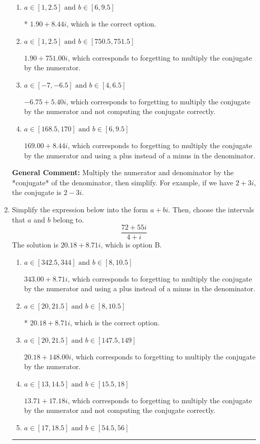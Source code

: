 \documentclass{extbook}[14pt]
\newcommand{\litem}[1]{\item #1

\rule{\textwidth}{0.4pt}}
\begin{document}
\begin{enumerate}
{\begin{enumerate}[label=\Alph*.]
 $-3.38  + 15.40 i$, which corresponds to just dividing the first term by the first term and the second by the second.
\item \( a \in [1, 2.5] \text{ and } b \in [6, 9.5] \)

* $1.90  + 8.44 i$, which is the correct option.
\item \( a \in [1, 2.5] \text{ and } b \in [750.5, 751.5] \)

 $1.90  + 751.00 i$, which corresponds to forgetting to multiply the conjugate by the numerator.
\item \( a \in [-7, -6.5] \text{ and } b \in [4, 6.5] \)

 $-6.75  + 5.40 i$, which corresponds to forgetting to multiply the conjugate by the numerator and not computing the conjugate correctly.
\item \( a \in [168.5, 170] \text{ and } b \in [6, 9.5] \)

 $169.00  + 8.44 i$, which corresponds to forgetting to multiply the conjugate by the numerator and using a plus instead of a minus in the denominator.
\end{enumerate}

\textbf{General Comment:} Multiply the numerator and denominator by the *conjugate* of the denominator, then simplify. For example, if we have $2+3i$, the conjugate is $2-3i$.
}
\litem{
Simplify the expression below into the form $a+bi$. Then, choose the intervals that $a$ and $b$ belong to.
\[ \frac{72 + 55 i}{4 + i} \]The solution is \( 20.18  + 8.71 i \), which is option B.\begin{enumerate}[label=\Alph*.]
\item \( a \in [342.5, 344] \text{ and } b \in [8, 10.5] \)

 $343.00  + 8.71 i$, which corresponds to forgetting to multiply the conjugate by the numerator and using a plus instead of a minus in the denominator.
\item \( a \in [20, 21.5] \text{ and } b \in [8, 10.5] \)

* $20.18  + 8.71 i$, which is the correct option.
\item \( a \in [20, 21.5] \text{ and } b \in [147.5, 149] \)

 $20.18  + 148.00 i$, which corresponds to forgetting to multiply the conjugate by the numerator.
\item \( a \in [13, 14.5] \text{ and } b \in [15.5, 18] \)

 $13.71  + 17.18 i$, which corresponds to forgetting to multiply the conjugate by the numerator and not computing the conjugate correctly.
\item \( a \in [17, 18.5] \text{ and } b \in [54.5, 56] \)


\end{enumerate}}
\end{enumerate}
\end{document}
